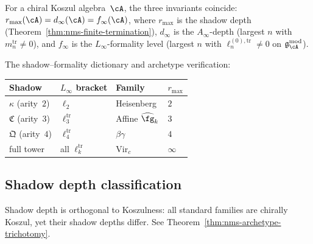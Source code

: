 \begin{conjecture}
\label{thm:operadic-complexity}
For a chiral Koszul algebra~$\cA$, the three invariants
coincide: $r_{\max}(\cA) = d_\infty(\cA) = f_\infty(\cA)$,
where $r_{\max}$ is the shadow depth
(Theorem~\ref{thm:nms-finite-termination}), $d_\infty$ is
the $A_\infty$-depth (largest $n$ with $m_n^{\mathrm{tr}}
\neq 0$), and $f_\infty$ is the $L_\infty$-formality level
(largest $n$ with $\ell_n^{(0),\mathrm{tr}} \neq 0$ on
$\mathfrak{g}_\cA^{\mathrm{mod}}$).
\end{conjecture}

\noindent
The shadow--formality dictionary and archetype verification:

\begin{center}
\renewcommand{\arraystretch}{1.15}
\begin{tabular}{@{}llll@{}}
\toprule
\textbf{Shadow} & \textbf{$L_\infty$ bracket}
  & \textbf{Family} & $r_{\max}$ \\
\midrule
$\kappa$ (arity~$2$) & $\ell_2$
  & Heisenberg & $2$ \\
$\mathfrak{C}$ (arity~$3$) & $\ell_3^{\mathrm{tr}}$
  & Affine $\widehat{\fg}_k$ & $3$ \\
$\mathfrak{Q}$ (arity~$4$) & $\ell_4^{\mathrm{tr}}$
  & $\beta\gamma$ & $4$ \\
full tower & all $\ell_k^{\mathrm{tr}}$
  & $\mathrm{Vir}_c$ & $\infty$ \\
\bottomrule
\end{tabular}
\end{center}


\subsection{Shadow depth classification}
\label{subsec:concordance-shadow-depth-classes}

Shadow depth is orthogonal to Koszulness: all standard
families are chirally Koszul, yet their shadow depths differ.
See Theorem~\ref{thm:nms-archetype-trichotomy}.

